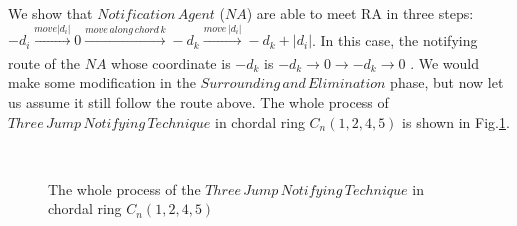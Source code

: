 \documentclass[conference]{IEEEtran}
\begin{document}
We show that $Notification\,Agent$ ($NA$) are able to meet RA in three steps: $-d_i\xrightarrow[]{move\left | d_i \right |}0\xrightarrow[]{move\,along\,chord\,k}-d_k\xrightarrow[]{move\,\left | d_i \right |}-d_k+\left|d_i\right|$. In this case, the notifying route of the $NA$ whose coordinate is $-d_k$ is $-d_k{\rightarrow}0{\rightarrow}-d_k{\rightarrow}0$ . We would make some modification in the $Surrounding\,and\,Elimination$ phase, but now let us assume it still follow the route above. The whole process of $Three\,Jump\,Notifying\,Technique$ in chordal ring $C_n(1, 2, 4, 5)$ is shown in Fig.\ref{fig:subfig}. 

\begin{figure}
  \centering 
  \hspace{1in} 
   \
  \hspace{1in} 
  \hspace{1in} 
  \caption{The whole process of the $Three\,Jump\,Notifying\,Technique$ in chordal ring $C_n(1, 2, 4, 5)$} 
  \label{fig:subfig} %
\end{figure}
\end{document}
